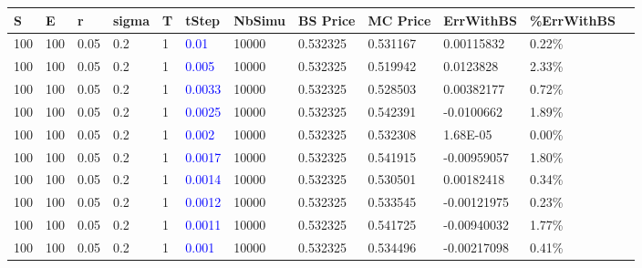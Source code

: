\documentclass[11pt,oneside,a4paper, titlepage]{article}
\begin{document}
{
\centering
\begin{tabular}{|l|l|l|l|l|l|l|l|l|l|l|l|}
\hline
\small{\textbf{S}} &  \small{\textbf{E}} & \small{\textbf{r}} & \small{\textbf{sigma}} & \small{\textbf{T}}	&  \small{\textbf{tStep}} & \small{\textbf{NbSimu}} & \small{\textbf{BS Price}} & \small{\textbf{MC Price}} & \small{\textbf{ErrWithBS}} & \small{\textbf{\%ErrWithBS}}\\
\hline
100 & 100 & 0.05 & 0.2 & 1 & \textcolor{blue}{0.01} & 10000 & 0.532325 & 0.531167 & 0.00115832 & 0.22\%\\
\hline
100 & 100 & 0.05 & 0.2 & 1 & \textcolor{blue}{0.005} & 10000 & 0.532325 & 0.519942 & 0.0123828 & 2.33\%\\
\hline
100 & 100 & 0.05 & 0.2 & 1 & \textcolor{blue}{0.0033} & 10000 & 0.532325 & 0.528503 & 0.00382177 & 0.72\%\\
\hline
100 & 100 & 0.05 & 0.2 & 1 & \textcolor{blue}{0.0025} & 10000 & 0.532325 & 0.542391 & -0.0100662 & 1.89\%\\
\hline
100 & 100 & 0.05 & 0.2 & 1 & \textcolor{blue}{0.002} & 10000 & 0.532325 & 0.532308 & 1.68E-05 & 0.00\%\\
\hline
100 & 100 & 0.05 & 0.2 & 1 & \textcolor{blue}{0.0017} & 10000 & 0.532325 & 0.541915 & -0.00959057 & 1.80\%\\
\hline
100 & 100 & 0.05 & 0.2 & 1 & \textcolor{blue}{0.0014}  & 10000 & 0.532325 & 0.530501 & 0.00182418 & 0.34\%\\
\hline
100 & 100 & 0.05 & 0.2 & 1 & \textcolor{blue}{0.0012} & 10000 & 0.532325 & 0.533545 & -0.00121975 & 0.23\%\\
\hline
100 & 100 & 0.05 & 0.2 & 1 & \textcolor{blue}{0.0011}  & 10000 & 0.532325 & 0.541725 & -0.00940032 & 1.77\%\\
\hline
100 & 100 & 0.05 & 0.2 & 1 & \textcolor{blue}{0.001} & 10000 & 0.532325 & 0.534496 & -0.00217098 & 0.41\%\\
\hline
\end{tabular}
}
\end{document}
